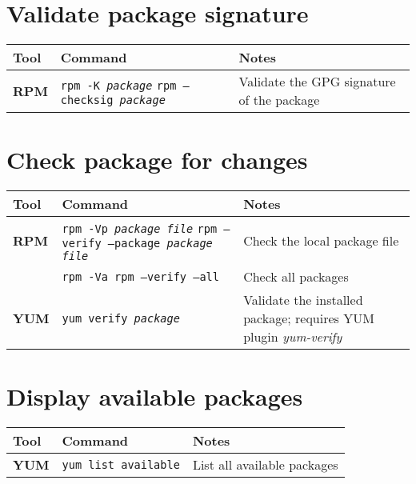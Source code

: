 \documentclass[10pt]{article}
\begin{document}
\section{Validate package signature}
\begin{tabular}{ p{3.5cm} p{9cm} p{11cm}}
  \hline
  \rowcolor{Gray}
  \textbf{Tool} & \textbf{Command} & \textbf{Notes} \\
  \hline 
  \textbf{RPM} & \texttt{rpm -K \textit{package}} \newline \texttt{rpm --checksig \textit{package}} & Validate the GPG signature of the package \\
  \hline
\end{tabular}

\section{Check package for changes}
\begin{tabular}{ p{3.5cm} p{9cm} p{11cm}}
  \hline
  \rowcolor{Gray}
  \textbf{Tool} & \textbf{Command} & \textbf{Notes} \\
  \hline 
  \textbf{RPM} & \texttt{rpm -Vp \textit{package file}} \newline \texttt{rpm --verify --package \textit{package file}} & Check the local package file\\
  \rowcolor{Gray}
  & \texttt{rpm -Va \newline \texttt{rpm --verify --all }} & Check all packages \\
  \textbf{YUM} & \texttt{yum verify \textit{package}} & Validate the installed package; requires YUM plugin \textit{yum-verify} \\
  \hline
\end{tabular}

\newpage

\cheatsheet

\section{Display available packages}
\begin{tabular}{ p{3.5cm} p{9cm} p{11cm}}
  \hline
  \rowcolor{Gray}
  \textbf{Tool} & \textbf{Command} & \textbf{Notes} \\
  \hline 
  \textbf{YUM} & \texttt{yum list available} & List all available packages\\
  \hline
\end{tabular}
\end{document}
